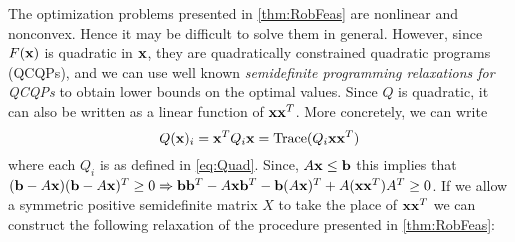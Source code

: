 

The optimization problems presented in \cref{thm:RobFeas} are nonlinear and nonconvex.
Hence it may be difficult to solve them in general.
However, since $F(\mathbf{x})$ is quadratic in $\mathbf{x}$, they are quadratically constrained quadratic programs (QCQPs), and we can use well known \emph{semidefinite programming relaxations for QCQPs} 
to obtain lower bounds on the optimal values.\cite{VaBo1996} 
Since $Q$ is quadratic, it can also be written as a linear function of $\mathbf{x}\mathbf{x}^T$.
More concretely, we can write
$$Q(\mathbf{x})_i=\mathbf{x}^TQ_i\mathbf{x}=\operatorname{Trace}(Q_i\mathbf{x}\mathbf{x}^T)$$
where each $Q_i$ is as defined in \cref{eq:Quad}. 
Since, $A\mathbf{x}\leq \mathbf{b}$ this implies that $(\mathbf{b}-A\mathbf{x})(\mathbf{b}-A\mathbf{x})^T\geq 0\Rightarrow \mathbf{b}\mathbf{b}^T-A\mathbf{x}\mathbf{b}^T-\mathbf{b}(A\mathbf{x})^T+A(\mathbf{x}\mathbf{x}^T)A^T\geq 0$. 
If we allow a symmetric positive semidefinite matrix $X$ to take the place of $\mathbf{x}\mathbf{x}^T$ we can construct the following relaxation of the procedure presented in \cref{thm:RobFeas}:
 
